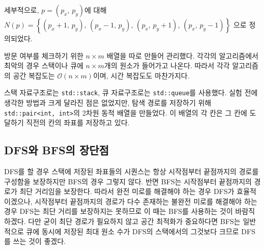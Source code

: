 세부적으로, $p=\left(p_x,\,p_y\right)$에 대해
$N\left(p\right)=\left\{\left(p_x + 1,\,p_y\right),\,\left(p_x - 1,\,p_y\right),\,\left(p_x,\,p_y + 1\right),\,\left(p_x,\,p_y - 1\right)\right\}$
으로 정의되었다.

방문 여부를 체크하기 위한 $n\times m$ 배열을 따로 만들어 관리했다. 각각의 알고리즘에서 최악의 경우 스택이나 큐에 $n\times m$개의 원소가 들어가고 나온다.
따라서 각각 알고리즘의 공간 복잡도는 $\mathcal{O}\left(n\times m\right)$이며, 시간 복잡도도 마찬가지다.

스택 자료구조로는 \texttt{std::stack}, 큐 자료구조로는 \texttt{std::queue}를 사용했다.
실험 전에 생각한 방법과 크게 달라진 점은 없었지만, 탐색 경로를 저장하기 위해 \texttt{std::pair<int, int>}의 2차원 동적 배열을 만들었다.
이 배열의 각 칸은 그 칸에 도달하기 직전의 칸의 좌표를 저장하고 있다.

\subsection{DFS와 BFS의 장단점}
DFS를 할 경우 스택에 저장된 좌표들의 시퀀스는 항상 시작점부터 끝점까지의 경로를 구성함을 보장하지만 BFS의 경우 그렇지 않다.
반면 BFS는 시작점부터 끝점까지의 경로가 최단 거리임을 보장한다. 따라서 완전 미로를 해결해야 하는 경우 DFS가 효율적이겠으나,
시작점부터 끝점까지의 경로가 다수 존재하는 불완전 미로를 해결해야 하는 경우 DFS는 최단 거리를 보장하지는 못하므로 이 때는 BFS를 사용하는 것이
바람직하겠다. 다만 굳이 최단 경로가 필요하지 않고 공간 최적화가 중요하다면 BFS는 일반적으로 큐에 동시에 저장된 최대 원소 수가 DFS의 스택에서의 그것보다 크므로
DFS를 쓰는 것이 좋겠다.


